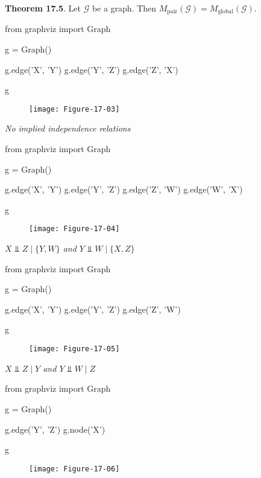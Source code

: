\textbf{Theorem 17.5}. Let \(\mathcal{G}\) be a graph. Then
\(M_\text{pair}(\mathcal{G}) = M_\text{global}(\mathcal{G})\).

\begin{python}
from graphviz import Graph

g = Graph()

g.edge('X', 'Y')
g.edge('Y', 'Z')
g.edge('Z', 'X')

g
\end{python}
 
\begin{figure}[H]
\centering
\texttt{[image: Figure-17-03]}
\end{figure}

\emph{No implied independence relations}

\begin{python}
from graphviz import Graph

g = Graph()

g.edge('X', 'Y')
g.edge('Y', 'Z')
g.edge('Z', 'W')
g.edge('W', 'X')

g
\end{python}
 
\begin{figure}[H]
\centering
\texttt{[image: Figure-17-04]}
\end{figure}

\emph{\(X \text{ ⫫ } Z \;|\; \{Y, W\}\) and
\(Y \text{ ⫫ } W \;|\; \{X, Z\}\)}

\begin{python}
from graphviz import Graph

g = Graph()

g.edge('X', 'Y')
g.edge('Y', 'Z')
g.edge('Z', 'W')

g
\end{python}
 
\begin{figure}[H]
\centering
\texttt{[image: Figure-17-05]}
\end{figure}

\emph{\(X \text{ ⫫ } Z \;|\; Y\) and \(Y \text{ ⫫ } W \;|\; Z\)}

\begin{python}
from graphviz import Graph

g = Graph()

g.edge('Y', 'Z')
g.node('X')

g
\end{python}

 
\begin{figure}[H]
\centering
\texttt{[image: Figure-17-06]}
\end{figure}

